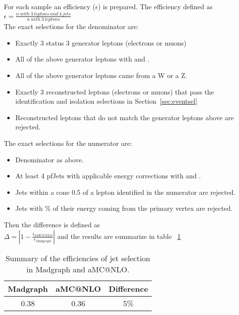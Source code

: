 For each sample an efficiency ($\epsilon$) is prepared. The efficiency defined as\\
$\epsilon = \frac{n\ with\ 3\ leptons\ and\ 4\ jets}{n\ with\ 3\ leptons}$\\

The exact selections for the denominator are:
\begin{itemize}
\item Exactly 3 status 3 generator leptons (electrons or muons)
\item All of the above generator leptons with \pt {} \GeV and \aeta {}.
\item All of the above generator leptons came from a W or a Z.
\item Exactly 3 reconstructed leptons (electrons or muons) that pass the identification and isolation selections in Section~\ref{sec:eventsel}
\item Reconstructed leptons that do not match the generator leptons above are rejected.
\end{itemize}

The exact selections for the numerator are:
\begin{itemize}
\item Denominator as above.
\item At least 4 pfJets with applicable energy corrections with \pt {} \GeV and \aeta {}. 
\item Jets within a cone 0.5 of a lepton identified in the numerator are rejected.
\item Jets with \% of their energy coming from the primary vertex are rejected.
\end{itemize}

Then the difference is defined as\\
$\Delta = | 1 - \frac{\epsilon _{aMC@NLO}}{\epsilon _{Madgraph}} |$
and the results are summarize in table ~\ref{tab:systgeneratorsum}

\begin{table}[h]
\begin{center}
\caption{\small\label{tab:systgeneratorsum} Summary of the efficiencies of jet selection in Madgraph and aMC@NLO.}
\begin{tabular}{ccc}\hline
Madgraph           &  aMC@NLO & Difference \\ \hline
0.38                      & 0.36              & 5\%\\
\hline
\end{tabular}
\end{center}
\end{table}

